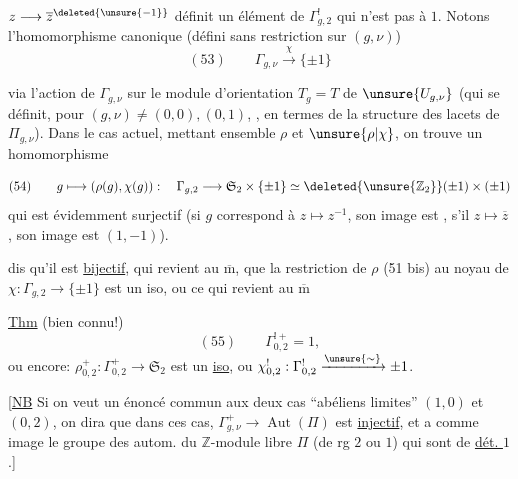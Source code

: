 $z\longrightarrow\overline z^{\deleted{\unsure{-1}}}$ définit un élément de $\Gamma^!_{g,2}$ qui n'est pas  à $1$. Notons   l'homomorphisme canonique (défini sans restriction sur $(g,\nu)$)
\[
(53)\qquad\Gamma_{g,\nu}\xrightarrow{\chi}\{\pm1\}
\]

via l'action de $\Gamma_{g,\nu}$ sur le module d'orientation $T_g=T$ de $\unsure{U_{g,\nu}}$  (qui se définit, pour $(g,\nu)\neq(0,0),(0,1)$, , en termes de la structure des lacets de $\Pi_{g,\nu}$). Dans le cas actuel, mettant ensemble $\rho$ et $\unsure{\rho|\chi}$, on trouve un homomorphisme

\[
(54)\qquad g\longmapsto(\rho(g),\chi(g)):\quad\Gamma_{g,2}\longrightarrow\mathfrak S_2\times\{\pm1\}
\simeq\deleted{\unsure{\mathbb{Z}_2}}(\pm1)\times(\pm1)
\]
qui est évidemment surjectif (si $g$ correspond à $z\longmapsto z^{-1}$, son image est , s'il  $z\longmapsto\overline z$, son image est $(1,-1)$).


 dis qu'il est \uline{bijectif}, 
qui revient au $\overline{\mathrm m}$, que la restriction de $\rho$ (51 bis) au noyau  de $\chi:\Gamma_{g,2}\longrightarrow\{\pm1\}$ est un iso, ou ce qui revient au $\overline{\mathrm m}$

\uline{Thm} (bien connu!)
\[
(55)\qquad\Gamma^{!+}_{0,2}=1,
\]
ou encore:
$\rho^+_{0,2}:\Gamma^+_{0,2}\longrightarrow\mathfrak S_2$ est un \uline{iso}, ou $\chi^!_{0,2}:\Gamma^!_{0,2}\xrightarrow{\unsure{\sim}}\pm1$.

[\uline{NB} Si on veut un énoncé commun aux  deux cas ``abéliens limites'' $(1,0)$ et $(0,2)$, on dira que dans ces cas, $\Gamma^+_{g,\nu}\longrightarrow\operatorname{Aut}(\Pi)$
est \uline{injectif}, et a comme image  le groupe des autom. du $\mathbb{Z}$-module libre $\Pi$ (de rg $2$ ou $1$) qui sont de \uline{dét. $1$}.]

